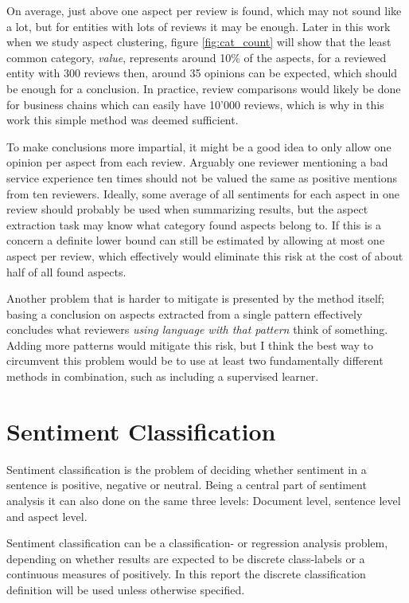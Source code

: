 \documentclass[a4paper,11pt]{kth-mag}
\begin{document}
On average, just above one aspect per review is found, which may not sound like a lot, but for entities with lots of reviews it may be enough. Later in this work when we study aspect clustering, figure \ref{fig:cat_count} will show that the least common category, \emph{value}, represents around 10\% of the aspects, for a reviewed entity with 300 reviews then, around 35 opinions can be expected, which should be enough for a conclusion. In practice, review comparisons would likely be done for business chains which can easily have 10'000 reviews, which is why in this work this simple method was deemed sufficient.

To make conclusions more impartial, it might be a good idea to only allow one opinion per aspect from each review. Arguably one reviewer mentioning a bad service experience ten times should not be valued the same as positive mentions from ten reviewers. Ideally, some average of all sentiments for  each aspect in one review should probably be used when summarizing results, but the aspect extraction task may know what category found aspects belong to. If this is a concern a definite lower bound can still be estimated by allowing at most one aspect per review, which effectively would eliminate this risk at the cost of about half of all found aspects.

Another problem that is harder to mitigate is presented by the method itself; basing a conclusion on aspects extracted from a single pattern effectively concludes what reviewers \emph{using language with that pattern} think of something. Adding more patterns would mitigate this risk, but I think the best way to circumvent this problem would be to use at least two fundamentally different methods in combination, such as including a supervised learner.


\chapter{Sentiment Classification}
Sentiment classification is the problem of deciding whether sentiment in a sentence is positive, negative or neutral\cite{nlp_book}. Being a central part of sentiment analysis it can also done on the same three levels: Document level, sentence level and aspect level.

Sentiment classification can be a classification- or regression analysis problem\cite{liu2012sentiment}, depending on whether results are expected to be discrete class-labels or a continuous measures of positively. In this report the discrete classification definition will be used unless otherwise specified.
\end{document}
